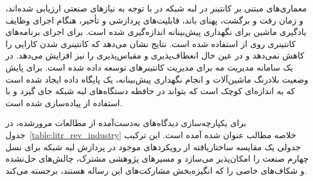 معماری‌های مبتنی بر کانتینر در لبه شبکه در \cite{liu2021performance} با توجه به نیازهای صنعتی ارزیابی شده‌اند، و زمان رفت و برگشت، پهنای باند، قابلیت‌های پردازشی و تأخیر، هنگام اجرای وظایف یادگیری ماشین برای نگهداری پیش‌بینانه اندازه‌گیری شده است. برای اجرای برنامه‌های کانتینری روی  از  استفاده شده است. نتایج نشان می‌دهد که کانتینری شدن کارایی را کاهش نمی‌دهد و در عین حال انعطاف‌پذیری و مقیاس‌پذیری را نیز افزایش می‌دهد. در \cite{oyekanlu2017predictive} یک سامانه مدیریت مه برای مدیریت کانتینرهای  توسعه داده شده است. برای پایش وضعیت بلادرنگ ماشین‌آلات و انجام نگهداری پیش‌بینانه، یک پایگاه داده ایجاد شده است که به اندازه‌ای کوچک است که بتواند در حافظه دستگاه‌های لبه شبکه جای گیرد و با استفاده از  پیاده‌سازی شده است.

برای یکپارچه‌سازی دیدگاه‌های به‌دست‌آمده از مطالعات مرورشده، در جدول~\ref{table:litr_rev_industry} خلاصه مطالب عنوان شده آمده است. این ترکیب جدولی یک مقایسه ساختاریافته از رویکردهای موجود در پردازش لبه‌ شبکه برای نسل چهارم صنعت را امکان‌پذیر می‌سازد و مسیرهای پژوهشی مشترک، چالش‌های حل‌نشده و شکاف‌های خاصی را که انگیزه‌بخش مشارکت‌های این رساله هستند، برجسته می‌کند.


